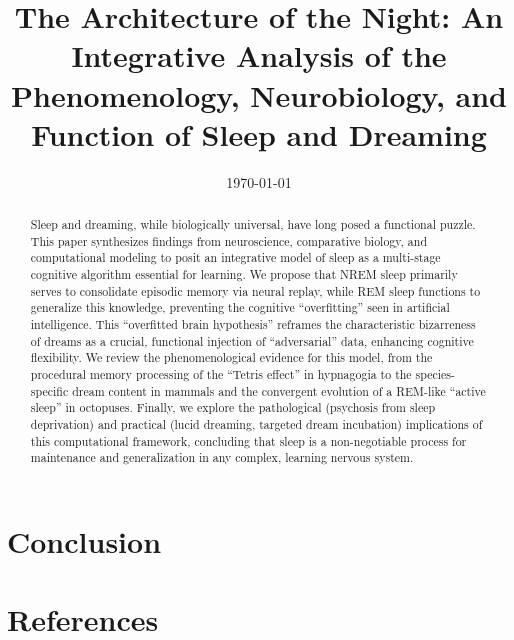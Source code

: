 \documentclass[a4paper]{report}
\title{The Architecture of the Night: An Integrative Analysis of the Phenomenology, Neurobiology, and Function of Sleep and Dreaming}
\author{}
\date{\today}
\numberwithin{equation}{chapter}
\numberwithin{figure}{chapter}
\numberwithin{table}{chapter}
\begin{document}
\maketitle

\begin{abstract}
\noindent Sleep and dreaming, while biologically universal, have long posed a functional puzzle. This paper synthesizes findings from neuroscience, comparative biology, and computational modeling to posit an integrative model of sleep as a multi-stage cognitive algorithm essential for learning. We propose that NREM sleep primarily serves to consolidate episodic memory via neural replay, while REM sleep functions to generalize this knowledge, preventing the cognitive ``overfitting'' seen in artificial intelligence. This ``overfitted brain hypothesis'' reframes the characteristic bizarreness of dreams as a crucial, functional injection of ``adversarial'' data, enhancing cognitive flexibility. We review the phenomenological evidence for this model, from the procedural memory processing of the ``Tetris effect'' in hypnagogia to the species-specific dream content in mammals and the convergent evolution of a REM-like ``active sleep'' in octopuses. Finally, we explore the pathological (psychosis from sleep deprivation) and practical (lucid dreaming, targeted dream incubation) implications of this computational framework, concluding that sleep is a non-negotiable process for maintenance and generalization in any complex, learning nervous system.
\end{abstract}



\tableofcontents

\newpage






\part*{Conclusion}\label{ch:conclusion}



\newpage
\part*{References}


\end{document}
